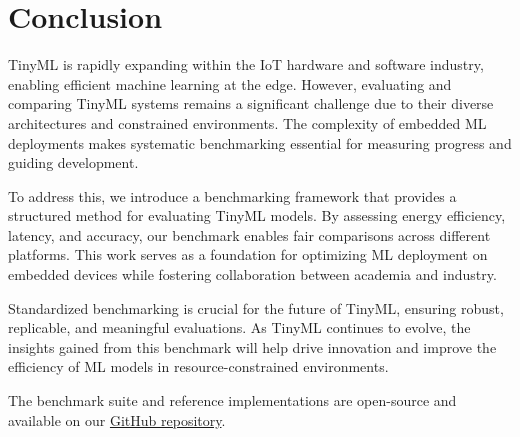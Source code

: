 \documentclass[conference]{IEEEtran}
\begin{document}
\section{Conclusion}

TinyML is rapidly expanding within the IoT hardware and software industry, enabling efficient machine learning at the edge. However, evaluating and comparing TinyML systems remains a significant challenge due to their diverse architectures and constrained environments. The complexity of embedded ML deployments makes systematic benchmarking essential for measuring progress and guiding development.

To address this, we introduce a benchmarking framework that provides a structured method for evaluating TinyML models. By assessing energy efficiency, latency, and accuracy, our benchmark enables fair comparisons across different platforms. This work serves as a foundation for optimizing ML deployment on embedded devices while fostering collaboration between academia and industry.

Standardized benchmarking is crucial for the future of TinyML, ensuring robust, replicable, and meaningful evaluations. As TinyML continues to evolve, the insights gained from this benchmark will help drive innovation and improve the efficiency of ML models in resource-constrained environments.

The benchmark suite and reference implementations are open-source and available on our {\href{https://github.com/Sharif-University-ESRLab/fall2024-embeddedml-benchmark}{GitHub repository}}.
\end{document}
